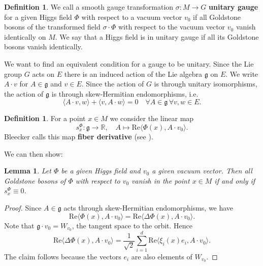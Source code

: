 \documentclass[11pt]{amsart}
\newtheorem{lem}[thm]{Lemma}
\theoremstyle{definition}
\newtheorem{defn}[thm]{Definition}
\theoremstyle{remark}
\numberwithin{equation}{section}
\begin{document}
\begin{defn}We call a smooth gauge transformation $\sigma\colon M\rightarrow G$ {\bf unitary gauge} for a given Higgs field $\Phi$ with respect to a vacuum vector $v_0$ if all Goldstone bosons of the transformed field $\sigma\cdot\Phi$ with respect to the vacuum vector $v_0$ vanish identically on $M$. We say that a Higgs field is in unitary gauge if all its Goldstone bosons vanish identically.
\end{defn}
We want to find an equivalent condition for a gauge to be unitary. Since the Lie group $G$ acts on $E$ there is an induced action of the Lie algebra $\mathfrak{g}$ on $E$. We write $A\cdot v$ for $A\in\mathfrak{g}$ and $v\in E$. Since the action of $G$ is through unitary isomorphisms, the action of $\mathfrak{g}$ is through skew-Hermitian endomorphisms, i.e.
\begin{equation*}
\langle A\cdot v,w\rangle+ \langle v,A\cdot w\rangle=0\quad\forall A\in\mathfrak{g}\,\forall v,w\in E.
\end{equation*}
\begin{defn}For a point $x\in M$ we consider the linear map 
\begin{equation*}
s^\Phi_x\colon\mathfrak{g}\longrightarrow\mathbb{R},\quad A\longmapsto\mathrm{Re}\langle\Phi(x),A\cdot v_0\rangle.
\end{equation*}
Bleecker calls this map {\bf fiber derivative} (see \cite{Bleecker}).
\end{defn}
We can then show:
\begin{lem}Let $\Phi$ be a given Higgs field and $v_0$ a given vacuum vector. Then all Goldstone bosons of $\Phi$ with respect to $v_0$ vanish in the point $x\in M$ if and only if $s^\Phi_x\equiv 0$.
\end{lem}
\begin{proof} Since $A\in\mathfrak{g}$ acts through skew-Hermitian endomorphisms, we have 
\begin{equation*}
\mathrm{Re}\langle\Phi(x),A\cdot v_0\rangle =\mathrm{Re}\langle \Delta\Phi(x),A\cdot v_0\rangle.
\end{equation*} 
Note that $\mathfrak{g}\cdot v_0=W_{v_0}$, the tangent space to the orbit. Hence 
\begin{equation*}
\mathrm{Re}\langle \Delta\Phi(x),A\cdot v_0\rangle=\frac{1}{\sqrt{2}}\sum_{i=1}^d\mathrm{Re}\langle\xi_i(x)e_i,A\cdot v_0\rangle.
\end{equation*}
The claim follows because the vectors $e_i$ are also elements of $W_{v_0}$.
\end{proof}
\end{document}
